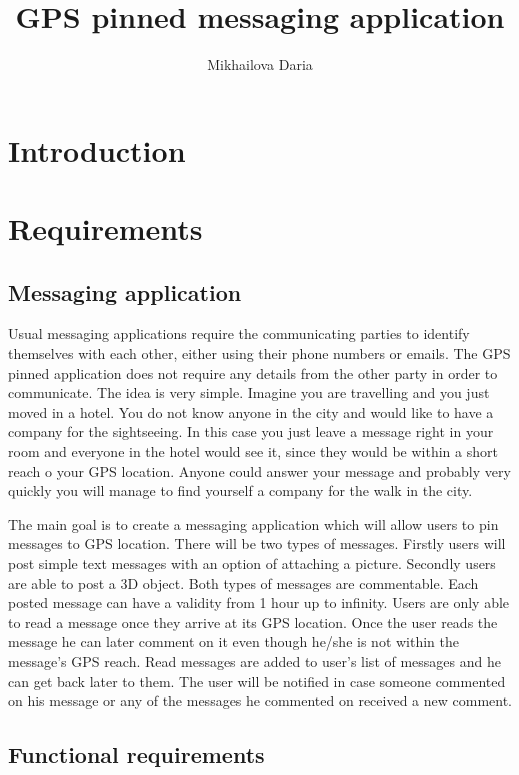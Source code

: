 \documentclass[thesis=M,english]{FITthesis}[2012/10/20]
\title{GPS pinned messaging application}
\author{Mikhailova Daria} %
\begin{document}

\chapter{Introduction}



\chapter{Requirements}
\section{Messaging application}

Usual messaging applications require the communicating parties to identify themselves with each other, either using their phone numbers or emails. The GPS pinned application does not require any details from the other party in order to communicate. The idea is very simple. Imagine you are travelling and you just moved in a hotel. You do not know anyone in the city and would like to have a company for the sightseeing. In this case you just leave a message right in your room and everyone in the hotel would see it, since they would be within a short reach o your GPS location. Anyone could answer your message and probably very quickly you will manage to find yourself a company for the walk in the city.

The main goal is to create a messaging application which will allow users to pin messages to GPS location. There will be two types of messages. Firstly users will post simple text messages with an option of attaching a picture. Secondly users are able to post a 3D object. Both types of messages are commentable. Each posted message can have a validity from 1 hour up to infinity. Users are only able to read a message once they arrive at its GPS location. Once the user reads the message he can later comment on it even though he/she is not within the message's GPS reach. Read messages are added to user's list of messages and he can get back later to them. The user will be notified in case someone commented on his message or any of the messages he commented on received a new comment.

\section{Functional requirements}
\end{document}
